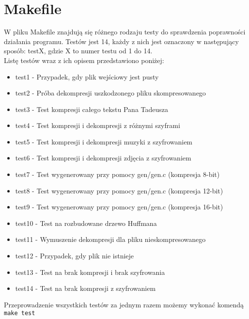 \documentclass[]{article}
\begin{document}
\section{Makefile}\label{header-n231}
W pliku Makefile znajdują się różnego rodzaju testy do sprawdzenia poprawności działania programu.
Testów jest 14, każdy z nich jest oznaczony w następujący sposób: testX, gdzie X to numer testu od 1 do 14.
\\Listę testów wraz z ich opisem przedstawiono poniżej:
\begin{itemize}
\item
test1 - Przypadek, gdy plik wejściowy jest pusty
\item
test2 - Próba dekompresji uszkodzonego pliku skompresowanego
\item
test3 - Test kompresji całego tekstu Pana Tadeusza
\item
test4 - Test kompresji i dekompresji z różnymi szyframi
\item
test5 - Test kompresji i dekompresji muzyki z szyfrowaniem
\item
test6 - Test kompresji i dekompresji zdjęcia z szyfrowaniem
\item
test7 - Test wygenerowany przy pomocy gen/gen.c (kompresja 8-bit)
\item
test8 - Test wygenerowany przy pomocy gen/gen.c (kompresja 12-bit)
\item
test9 - Test wygenerowany przy pomocy gen/gen.c (kompresja 16-bit)
\item
test10 - Test na rozbudowane drzewo Huffmana
\item
test11 - Wymuszenie dekompresji dla pliku nieskompresowanego
\item
test12 - Przypadek, gdy plik nie istnieje
\item
test13 - Test na brak kompresji i brak szyfrowania
\item
test14 - Test na brak kompresji z szyfrowaniem\\
\end{itemize}
Przeprowadzenie wszystkich testów za jednym razem możemy wykonać komendą \texttt{make test}
\end{document}
